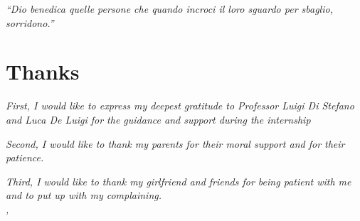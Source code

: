 
\cleardoublepage
{}
{}
\begin{flushright}{
	\slshape
	``Dio benedica quelle persone che quando incroci il loro sguardo per sbaglio, sorridono.''} \\
	\medskip
\end{flushright}


\bigskip

\begingroup

\chapter*{Thanks}

\noindent \textit{First, I would like to express my deepest gratitude to Professor Luigi Di Stefano and Luca De Luigi for the guidance and support during the internship}\\

\bigskip

\noindent \textit{Second, I would like to thank my parents for their moral support and for their patience.}\\
\bigskip

\noindent \textit{Third, I would like to thank my girlfriend and friends for being patient with me and to put up with my complaining.}\\

\noindent\textit{\myLocation, \myTime}
\hfill \myName

\endgroup

